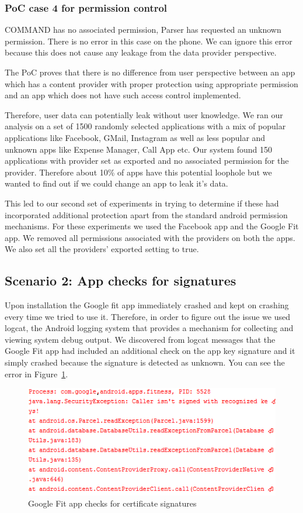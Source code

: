 \subsubsection{PoC case 4 for permission control} COMMAND has no associated permission, Parser has requested an unknown permission. There is no error in this case on the phone. We can ignore this error because this does not cause any leakage from the data provider perspective.

The PoC proves that there is no difference from user perspective between an app which has a content provider with proper protection using appropriate permission and an app which does not have such access control implemented.

Therefore, user data can potentially leak without user knowledge. We ran our analysis on a set of 1500 randomly selected applications with a mix of popular applications like Facebook, GMail, Instagram as well as less popular and unknown apps like Expense Manager, Call App etc. Our system found 150 applications with provider set as exported and no associated permission for the provider. Therefore about 10\% of apps have this potential loophole but we wanted to find out if we could change an app to leak it's data. 

This led to our second set of experiments in trying to determine if these had incorporated additional protection apart from the standard android permission mechanisms. For these experiments we used the Facebook app and the Google Fit app. We removed all permissions associated with the providers on both the apps. We also set all the providers' exported setting to true.

\subsection{Scenario 2: App checks for signatures} Upon installation the Google fit app immediately crashed and kept on crashing every time we tried to use it. Therefore, in order to figure out the issue we used logcat, the Android logging system that provides a mechanism for collecting and viewing system debug output. We discovered from logcat messages that the Google Fit app had included an additional check on the app key signature and it simply crashed because the signature is detected as unknown. You can see the error in Figure~\ref{fig:GoogleProtections}.

\begin{figure}[tb]
\centering
	\includegraphics[width=\columnwidth]{images/GoogleProtections}
	\caption{Google Fit app checks for certificate signatures}
	\label{fig:GoogleProtections}
\end{figure}

